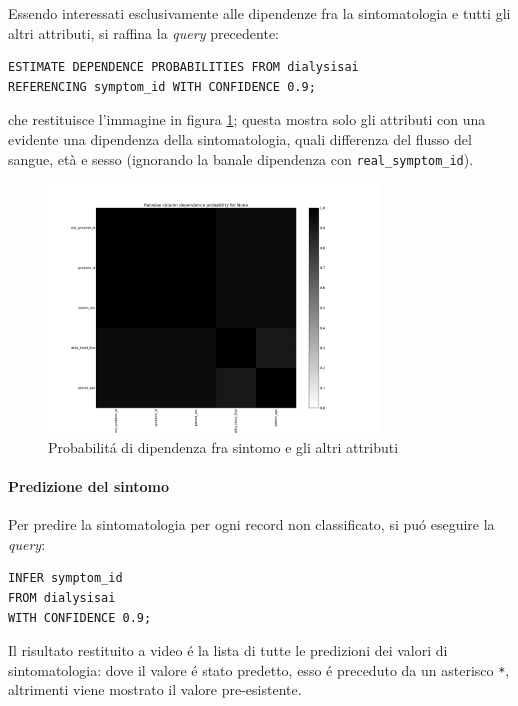 \documentclass[preprint]{acm_proc_article-sp}
\begin{document}
Essendo interessati esclusivamente alle dipendenze fra la sintomatologia e tutti gli altri attributi, si raffina la \textit{query} precedente:
\begin{verbatim}
ESTIMATE DEPENDENCE PROBABILITIES FROM dialysisai
REFERENCING symptom_id WITH CONFIDENCE 0.9;
\end{verbatim}
che restituisce l'immagine in figura \ref{fig:bayesdb-dep-prob2}; questa mostra solo gli attributi con una evidente una dipendenza della sintomatologia, quali differenza del flusso del sangue, età e sesso (ignorando la banale dipendenza con \verb|real_symptom_id|).

\begin{figure}[!htb]
\centering
\includegraphics[width=250pt]{../bayesdb/dialysis_prob_dependencies_symptom.png}
\caption{Probabilit\'a di dipendenza fra sintomo e gli altri attributi}
\label{fig:bayesdb-dep-prob2}
\end{figure}

\paragraph{Predizione del sintomo}
Per predire la sintomatologia per ogni record non classificato, si pu\'o eseguire la \textit{query}:
\begin{verbatim}
INFER symptom_id
FROM dialysisai
WITH CONFIDENCE 0.9;
\end{verbatim}

Il risultato restituito a video \'e la lista di tutte le predizioni dei valori di sintomatologia: dove il valore \'e stato predetto, esso \'e preceduto da un asterisco \verb|*|, altrimenti viene mostrato il valore pre-esistente.
\end{document}
